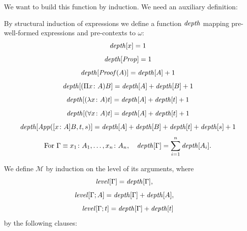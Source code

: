 We want to build this function by induction. We need an auxiliary definition:
\begin{definition}
    By structural induction of expressions we define a function $\depth$ mapping
    pre-well-formed expressions and pre-contexts to $\omega$:
    \[\depth[x] = 1\]
    \[\depth[\Prop] = 1\]
    \[\depth[\Proof(A)] = \depth[A] + 1\]
    \[\depth[(\Pi x \colon A) B] = \depth[A] + \depth[B] + 1\]
    \[\depth[(\lambda x \colon A) t] = \depth[A] + \depth[t] + 1\]
    \[\depth[(\forall x \colon A) t] =  \depth[A] + \depth[t] + 1\]
    \[\depth[\App([x \colon A] B, t, s)] = \depth[A] + \depth[B] + \depth[t] + \depth[s] + 1\]
    \[
        \text{For } \Gamma \equiv x_1 \colon A_1, \dots, x_n \colon A_n, 
        \quad
        \depth[\Gamma] = \sum_{i=1}^{n}\depth[A_i].
    \]
\end{definition}
We define $\mathcal{M}$ by induction on the level of its arguments, where
\[    \level[\Gamma] = \depth[\Gamma], \quad \]
\[    \level[\Gamma; A] = \depth[\Gamma] + \depth[A], \quad \]
\[    \level[\Gamma; t] = \depth[\Gamma] + \depth[t] \]
by the following clauses:
